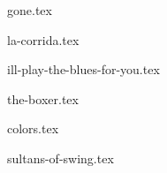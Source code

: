 \begin{songs}{}

  {gone.tex}
  \sclearpage

  {la-corrida.tex}
  \sclearpage

  {ill-play-the-blues-for-you.tex}
  \sclearpage

  {the-boxer.tex}
  \sclearpage  

  {colors.tex}
  \sclearpage

  {sultans-of-swing.tex}
  \sclearpage

 \end{songs}
